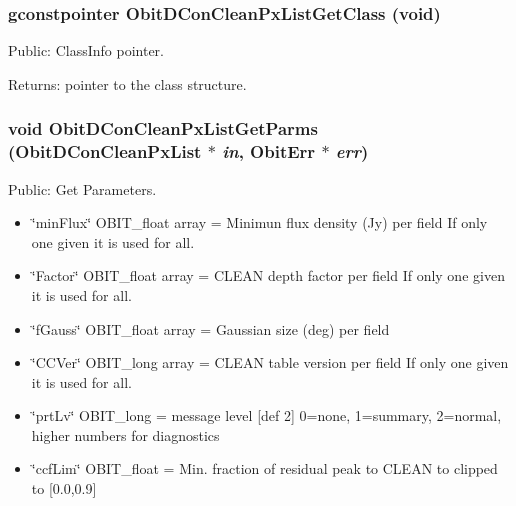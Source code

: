 \subsubsection{\setlength{\rightskip}{0pt plus 5cm}gconstpointer Obit\-DCon\-Clean\-Px\-List\-Get\-Class (void)}\label{ObitDConCleanPxList_8h_a13}


Public: Class\-Info pointer. 

\begin{Desc}
\item[Returns:]pointer to the class structure. \end{Desc}
\subsubsection{\setlength{\rightskip}{0pt plus 5cm}void Obit\-DCon\-Clean\-Px\-List\-Get\-Parms ({\bf Obit\-DCon\-Clean\-Px\-List} $\ast$ {\em in}, {\bf Obit\-Err} $\ast$ {\em err})}\label{ObitDConCleanPxList_8h_a17}


Public: Get Parameters. 

\begin{itemize}
\item \char`\"{}min\-Flux\char`\"{} OBIT\_\-float array = Minimun flux density (Jy) per field If only one given it is used for all. \item \char`\"{}Factor\char`\"{} OBIT\_\-float array = CLEAN depth factor per field If only one given it is used for all. \item \char`\"{}f\-Gauss\char`\"{} OBIT\_\-float array = Gaussian size (deg) per field \item \char`\"{}CCVer\char`\"{} OBIT\_\-long array = CLEAN table version per field If only one given it is used for all. \item \char`\"{}prt\-Lv\char`\"{} OBIT\_\-long = message level [def 2] 0=none, 1=summary, 2=normal, higher numbers for diagnostics \item \char`\"{}ccf\-Lim\char`\"{} OBIT\_\-float = Min. fraction of residual peak to CLEAN to clipped to [0.0,0.9] 
\end{itemize}
